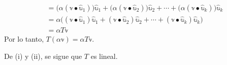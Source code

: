 \begin{observation}
\begin{enumerate}[label=\roman*)]
\begin{align*}
            & = \big(\alpha (\mathbb{v} \bullet \hat{\mathbb{u}}_1)\big)\hat{\mathbb{u}}_1 + \big(\alpha (\mathbb{v} \bullet \hat{\mathbb{u}}_2)\big)\hat{\mathbb{u}}_2 + \cdots + \big(\alpha (\mathbb{v} \bullet \hat{\mathbb{u}}_k)\big)\hat{\mathbb{u}}_k \\
            & = \alpha \big((\mathbb{v} \bullet \hat{\mathbb{u}}_1)\hat{\mathbb{u}}_1 + (\mathbb{v} \bullet \hat{\mathbb{u}}_2)\hat{\mathbb{u}}_2 + \cdots + (\mathbb{v} \bullet \hat{\mathbb{u}}_k)\hat{\mathbb{u}}_k\big) \\
            & = \alpha T\mathbb{v}
        \end{align*}
        Por lo tanto, $T(\alpha \mathbb{v}) = \alpha T\mathbb{v}$.
    \end{enumerate}
    De (i) y (ii), se sigue que $T$ es lineal.
\end{observation}

